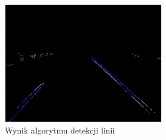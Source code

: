 \begin{figure}
  \centering
  \includegraphics[width=7cm]{img/prehough.png}
  \caption{Wynik algorytmu detekcji linii\cite{T3}}
  \label{fig:result}
\end{figure}

%
%
%
%
%
%
%



